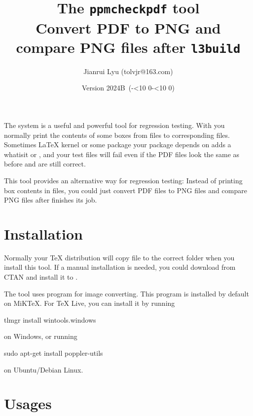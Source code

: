 \documentclass[oneside,12pt]{article}
\newcommand*{\myversion}{2024B}
\newcommand*{\mydate}{Version \myversion\ (\the\year-\mylpad\month-\mylpad\day)}
\newcommand*{\mylpad}[1]{\ifnum#1<10 0\the#1\else\the#1\fi}
\begin{document}
\title{\sffamily
  \textcolor{green3}{The \texttt{ppmcheckpdf} tool}\\
  {\large Convert PDF to PNG and compare PNG files after \texttt{l3build}}%
}
\author{%
  Jianrui Lyu (tolvjr@163.com)%
}
\date{\mydate}
\maketitle

The  system is a useful and powerful tool for regression testing.
With  you normally print the contents of some boxes from  files
to corresponding  files. Sometimes \LaTeX{} kernel or some package your package
depends on adds a whatisit or \mycmd{\kern0pt}, and your test files will fail even if
the PDF files look the same as before and are still correct.

This  tool provides an alternative way for regression testing:
Instead of printing box contents in  files, you could just convert PDF files
to PNG files and compare PNG files after  finishes its job.

\section{Installation}

Normally your TeX distribution will copy  file to the correct folder
when you install this tool. If a manual installation is needed, you could download
\href{https://ctan.org/pkg/ppmcheckpdf}{}
from CTAN and install it to .

The  tool uses  program for image converting.
This program is installed by default on MiKTeX. For TeX Live, you can install it by running
\begin{codehigh}
tlmgr install wintools.windows
\end{codehigh}
on Windows, or running
\begin{codehigh}
sudo apt-get install poppler-utils
\end{codehigh}
on Ubuntu/Debian Linux.

\section{Usages}
\end{document}
